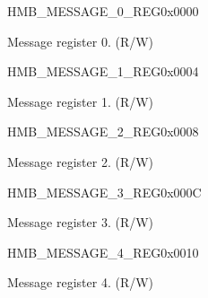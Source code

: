 \begin{register}{H}{MB\_MESSAGE\_0\_REG}{0x0000}\label{regdesc:MBMESSAGE0REG}
%
\regnewline%
\begin{regdesc}\begin{reglist}
\label{fielddesc:MBMESSAGE0}\item [MB\_MESSAGE\_0] Message register 0. (R/W)
\end{reglist}\end{regdesc}
\end{register}


\begin{register}{H}{MB\_MESSAGE\_1\_REG}{0x0004}\label{regdesc:MBMESSAGE1REG}
%
\regnewline%
\begin{regdesc}\begin{reglist}
\label{fielddesc:MBMESSAGE1}\item [MB\_MESSAGE\_1] Message register 1. (R/W)
\end{reglist}\end{regdesc}
\end{register}


\begin{register}{H}{MB\_MESSAGE\_2\_REG}{0x0008}\label{regdesc:MBMESSAGE2REG}
%
\regnewline%
\begin{regdesc}\begin{reglist}
\label{fielddesc:MBMESSAGE2}\item [MB\_MESSAGE\_2] Message register 2. (R/W)
\end{reglist}\end{regdesc}
\end{register}


\begin{register}{H}{MB\_MESSAGE\_3\_REG}{0x000C}\label{regdesc:MBMESSAGE3REG}
%
\regnewline%
\begin{regdesc}\begin{reglist}
\label{fielddesc:MBMESSAGE3}\item [MB\_MESSAGE\_3] Message register 3. (R/W)
\end{reglist}\end{regdesc}
\end{register}


\begin{register}{H}{MB\_MESSAGE\_4\_REG}{0x0010}\label{regdesc:MBMESSAGE4REG}
%
\regnewline%
\begin{regdesc}\begin{reglist}
\label{fielddesc:MBMESSAGE4}\item [MB\_MESSAGE\_4] Message register 4. (R/W)
\end{reglist}\end{regdesc}
\end{register}



